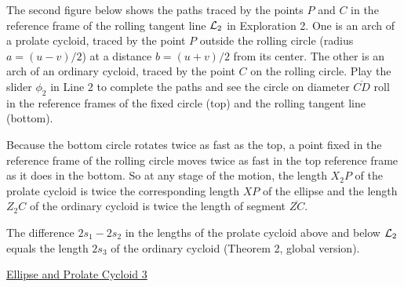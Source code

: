 \documentclass{ximera}
\begin{document}
\begin{exploration}  \label{EllipseProlateCycloid}
The second figure below shows the paths traced by the points $P$ and $C$ in the reference frame of the rolling tangent line ${\cal L}_2$ in Exploration 2. One is an arch of a prolate cycloid, traced by the point $P$ outside the rolling circle (radius $a = (u-v)/2$) at a distance $b=(u+v)/2$ from its center. The other is an arch of an ordinary cycloid, traced by the point $C$ on the rolling circle. Play the slider $\phi_2$ in Line 2 to complete the paths and see the circle on diameter $\overline{CD}$ roll in the reference frames of the fixed circle (top) and the rolling tangent line (bottom).




Because the bottom circle rotates twice as fast as the top, a point fixed in the reference frame of the rolling circle moves twice as fast in the top reference frame as it does in the bottom. So at any stage of the motion, the length $X_2P$ of the prolate cycloid is twice the corresponding length $XP$ of the ellipse and the length $Z_2C$ of the ordinary cycloid is twice the length of segment $\overline{ZC}$.

The difference $2s_1-2s_2$ in the lengths of the prolate cycloid above and below ${\cal L}_2$ equals the length $2s_3$ of the ordinary cycloid (Theorem 2, global version).  


\begin{onlineOnly}
    \begin{center}
\end{center}
\end{onlineOnly}

\href{https://www.desmos.com/calculator/jrcqvu50gh}{Ellipse and Prolate Cycloid 3}

\end{exploration}
\end{document}

